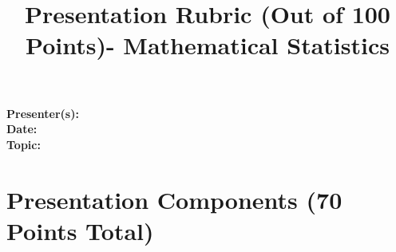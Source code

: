 \documentclass{article}
\begin{document}
\title{Presentation Rubric (Out of 100 Points)- Mathematical Statistics} 
\author{}
\date{}

\maketitle

\noindent
\textbf{Presenter(s):} \underline{\hspace{10cm}} \\
\textbf{Date:} \underline{\hspace{4cm}} \\
\textbf{Topic:} \underline{\hspace{10cm}}

\section*{Presentation Components (70 Points Total)}
\end{document}
